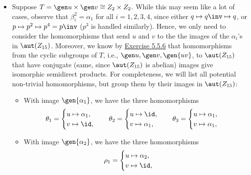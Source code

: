 \begin{solalph}
\begin{itemize}
\begin{enumerate}
            \[G_4 \cong \gen{p, t} \times \gen q \cong F_{20} \times Z_3.\]
            \item For $G_5 = Z_{15} \semidir_{\phi_5} Z_4$, we have $tpt\inv = p^2$ and $tqt\inv = q\inv$. Then
            \[G_5 \cong \set{p, q, t \mid p^5 = q^3 = t^4 = 1, pq = qp, tpt\inv = p^2, tqt\inv = q\inv} = F_{20} \semidir Z_3.\]
        \end{enumerate}
        \item Suppose $T = \gen u \times \gen v \cong Z_2 \times Z_2$. While this may seem like a lot of cases, observe that $\beta_i^2 = \alpha_1$ for all $i = 1, 2, 3, 4$, since either $q \mapsto q\inv \mapsto q$, or $p \mapsto p^2 \mapsto p^4 = p\inv$ ($p^3$ is handled similarly). Hence, we only need to consider the homomorphisms that send $u$ and $v$ to the the images of the $\alpha_i$'s in $\aut(Z_{15})$. Moreover, we know by \hyperref[ex5.5.6]{Exercise 5.5.6} that homomorphisms from the cyclic subgroups of $T$, i.e., $\gen u, \gen v, \gen{uv}$, to $\aut(Z_{15})$ that have conjugate (same, since $\aut(Z_{15})$ is abelian) images give isomorphic semidirect products. For completeness, we will list all potential non-trivial homomorphisms, but group them by their images in $\aut(Z_{15})$:
        \begin{itemize}
            \item With image $\gen{\alpha_1}$, we have the three homomorphisms
            \[\theta_1 = 
            \begin{cases}
                u \mapsto \alpha_1, \\
                v \mapsto \id,
            \end{cases} \quad
            \theta_2 =
            \begin{cases}
                u \mapsto \id, \\
                v \mapsto \alpha_1,
            \end{cases} \quad
            \theta_3 =
            \begin{cases}
                u \mapsto \alpha_1, \\
                v \mapsto \alpha_1,
            \end{cases}\]
            \item With image $\gen{\alpha_2}$, we have the three homomorphisms
            \[\rho_1 = 
            \begin{cases}
                u \mapsto \alpha_2, \\
                v \mapsto \id,
            \end{cases} \quad
\]
\end{itemize}
\end{itemize}
\end{solalph}
